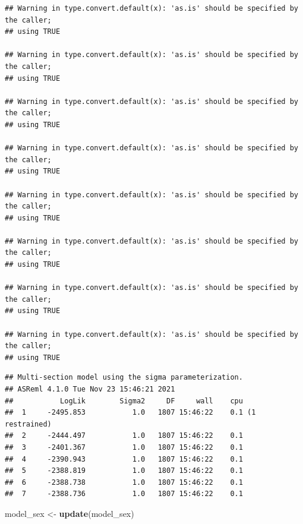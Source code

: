 \documentclass[
  12pt,
]{book}
\newenvironment{Shaded}{\begin{snugshade}}{\end{snugshade}}
\newcommand{\KeywordTok}[1]{\textcolor[rgb]{0.13,0.29,0.53}{\textbf{#1}}}
\newcommand{\NormalTok}[1]{#1}
\newcommand{\StringTok}[1]{\textcolor[rgb]{0.31,0.60,0.02}{#1}}
\begin{document}
\begin{verbatim}
## Warning in type.convert.default(x): 'as.is' should be specified by the caller;
## using TRUE

## Warning in type.convert.default(x): 'as.is' should be specified by the caller;
## using TRUE

## Warning in type.convert.default(x): 'as.is' should be specified by the caller;
## using TRUE

## Warning in type.convert.default(x): 'as.is' should be specified by the caller;
## using TRUE

## Warning in type.convert.default(x): 'as.is' should be specified by the caller;
## using TRUE

## Warning in type.convert.default(x): 'as.is' should be specified by the caller;
## using TRUE

## Warning in type.convert.default(x): 'as.is' should be specified by the caller;
## using TRUE

## Warning in type.convert.default(x): 'as.is' should be specified by the caller;
## using TRUE
\end{verbatim}

\begin{verbatim}
## Multi-section model using the sigma parameterization.
## ASReml 4.1.0 Tue Nov 23 15:46:21 2021
##           LogLik        Sigma2     DF     wall    cpu
##  1     -2495.853           1.0   1807 15:46:22    0.1 (1 restrained)
##  2     -2444.497           1.0   1807 15:46:22    0.1
##  3     -2401.367           1.0   1807 15:46:22    0.1
##  4     -2390.943           1.0   1807 15:46:22    0.1
##  5     -2388.819           1.0   1807 15:46:22    0.1
##  6     -2388.738           1.0   1807 15:46:22    0.1
##  7     -2388.736           1.0   1807 15:46:22    0.1
\end{verbatim}

\begin{Shaded}
\begin{Highlighting}[]
\NormalTok{model\_sex \textless{}{-}}\StringTok{ }\KeywordTok{update}\NormalTok{(model\_sex)}
\end{Highlighting}
\end{Shaded}
\end{document}
